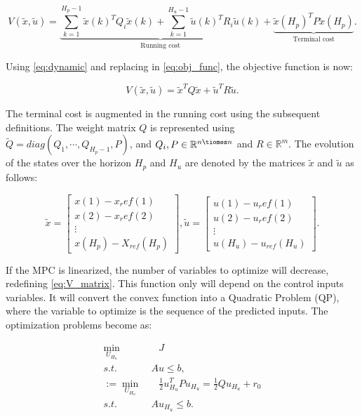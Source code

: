 \begin{equation}
    V(\tilde{x},\tilde{u})= \underbrace{\sum_{k=1}^{H_p-1} \tilde{x}(k)^T Q_i \tilde{x}(k) +\sum_{k=1}^{H_u-1} \tilde{u}(k)^T R_i \tilde{u}(k)}_\text{Running cost} + \underbrace{\tilde{x}(H_p)^T P \tilde{x}(H_p)}_\text{Terminal cost}.
    \label{eq:obj_func}
\end{equation}

Using \ref{eq:dynamic} and replacing in \ref{eq:obj_func}, the objective function is now:


\begin{equation}
    V(\tilde{x},\tilde{u})= \tilde{x}^T Q \tilde{x} +\tilde{u}^T R \tilde{u}.
    \label{eq:V_matrix}
\end{equation}

The terminal cost is augmented in the running cost using the subsequent definitions. The weight matrix $Q$ is represented using $\tilde{Q} = diag(Q_1,\cdots, Q_{H_p-1},P)$, and $Q_{i}, P \in \mathbb{R}^{n \tiomes n}$ and $R \in \mathbb{R}^m$. The evolution of the states over the horizon $H_p$ and $H_u$ are denoted by the matrices $\tilde{x}$ and $\tilde{u}$ as follows: 


\begin{equation}
    \tilde{x} = \begin{bmatrix}
x(1) - x_ref(1)\\ 
x(2) - x_ref(2)\\ 
\vdots  \\ 
x(H_p)-X_{ref}(H_p)
\end{bmatrix},
\tilde{u} = \begin{bmatrix}
u(1) - u_ref(1)\\ 
u(2) - u_ref(2)\\ 
\vdots  \\ 
u(H_u)-u_{ref}(H_u)
\end{bmatrix}.
\end{equation}


If the MPC is linearized, the number of variables to optimize will decrease, redefining \ref{eq:V_matrix}. This function only will depend on the control inputs variables. It will convert the convex function into a Quadratic Problem (QP), where the variable to optimize is the sequence of the predicted inputs. The optimization problems become as:

\begin{align}
\min_{U_{H_u}} & \quad J \\
s.t. & \ Au \le b, \\
:= \min_{U_{H_u}} & \quad \frac{1}{2}u^T_{H_u}Pu_{H_u} =\frac{1}{2}Qu_{H_u} + r_0 \\
s.t. & \ Au_{H_u} \le  b.
\label{eq:min}
\end{align}



